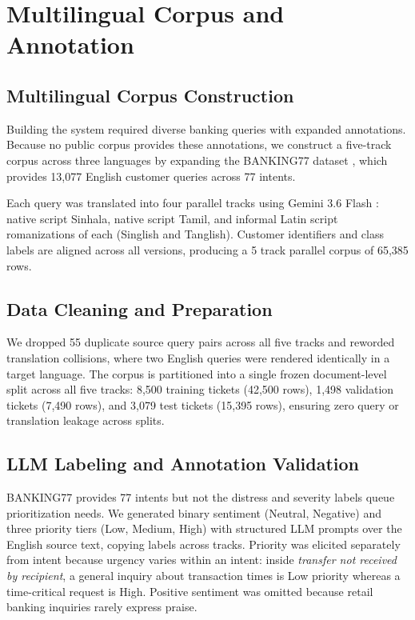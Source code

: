 \section{Multilingual Corpus and Annotation}
\label{sec:corpus}

\subsection{Multilingual Corpus Construction}

Building the system required diverse banking queries with expanded annotations. Because no public corpus provides these annotations, we construct a five-track corpus across three languages by expanding the BANKING77 dataset \cite{casanueva2020banking77}, which provides 13{,}077 English customer queries across 77 intents.

Each query was translated into four parallel tracks using Gemini 3.6 Flash \cite{geminiteam2023gemini}: native script Sinhala, native script Tamil, and informal Latin script romanizations of each (Singlish and Tanglish). Customer identifiers and class labels are aligned across all versions, producing a 5 track parallel corpus of 65{,}385 rows.


\subsection{Data Cleaning and Preparation}

We dropped 55 duplicate source query pairs across all five tracks and reworded translation collisions, where two English queries were rendered identically in a target language. The corpus is partitioned into a single frozen document-level split across all five tracks: 8{,}500 training tickets (42{,}500 rows), 1{,}498 validation tickets (7{,}490 rows), and 3{,}079 test tickets (15{,}395 rows), ensuring zero query or translation leakage across splits.

\subsection{LLM Labeling and Annotation Validation}

BANKING77 provides 77 intents but not the distress and severity labels queue
prioritization needs. We generated binary sentiment (Neutral, Negative) and
three priority tiers (Low, Medium, High) with structured LLM prompts over the
English source text, copying labels across tracks. Priority was elicited
separately from intent because urgency varies within an intent: inside
\emph{transfer not received by recipient}, a general inquiry about transaction
times is Low priority whereas a time-critical request is High. Positive
sentiment was omitted because retail banking inquiries rarely express praise.

